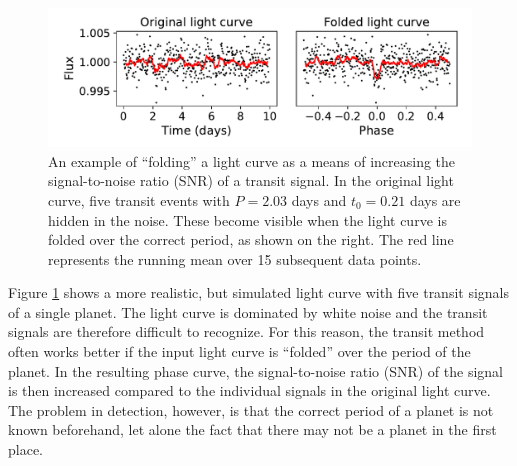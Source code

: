 \begin{figure}
    \centering
    \includegraphics[width=0.6\linewidth]{Background/Figures/folding.pdf}
    \caption{An example of ``folding'' a light curve as a means of increasing the signal-to-noise ratio (SNR) of a transit signal. In the original light curve, five transit events with $P= 2.03$ days and $t_0= 0.21$ days are hidden in the noise. These become visible when the light curve is folded over the correct period, as shown on the right. The red line represents the running mean over 15 subsequent data points.}
    \label{fig:folding}
\end{figure}

Figure \ref{fig:folding} shows a more realistic, but simulated light curve with five transit signals of a single planet. The light curve is dominated by white noise and the transit signals are therefore difficult to recognize. For this reason, the transit method often works better if the input light curve is ``folded'' over the period of the planet. In the resulting phase curve, the signal-to-noise ratio (SNR) of the signal is then increased compared to the individual signals in the original light curve. The problem in detection, however, is that the correct period of a planet is not known beforehand, let alone the fact that there may not be a planet in the first place.
